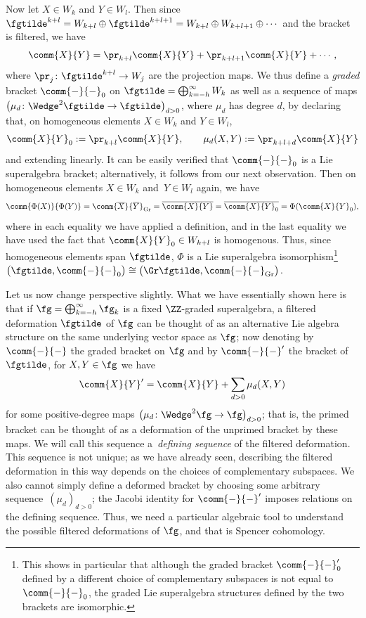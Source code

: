 Now let $X\in W_k$ and $Y\in W_l$. Then since $\fgtilde^{k+l} = W_{k+l}\oplus\fgtilde^{k+l+1} = W_{k+l}\oplus W_{k+l+1}\oplus\cdots$ and the bracket is filtered, we have
\[
	\comm{X}{Y} = \pr_{k+l}\comm{X}{Y} + \pr_{k+l+1}\comm{X}{Y} + \cdots,
\]
where $\pr_j\colon\fgtilde^{k+l}\to W_j$ are the projection maps. We thus define a \emph{graded} bracket $\comm{-}{-}_0$ on $\fgtilde=\bigoplus_{k=-h}^\infty W_k$ as well as a sequence of maps $\bigl(\mu_d\colon\Wedge^2\fgtilde\to\fgtilde\bigr)_{d> 0}$, where $\mu_d$ has degree $d$, by declaring that, on homogeneous elements $X\in W_k$ and $Y\in W_l$,
\[
	\comm{X}{Y}_0 := \pr_{k+l}\comm{X}{Y},	\qquad \mu_d(X,Y) := \pr_{k+l+d}\comm{X}{Y}
\]
and extending linearly. It can be easily verified that $\comm{-}{-}_0$ is a Lie superalgebra bracket; alternatively, it follows from our next observation. Then on homogeneous elements $X\in W_k$ and~${Y\in W_l}$ again, we have
\[
	\comm{\Phi(X)}{\Phi(Y)} = \comm{\overline{X}}{\overline{Y}}_{\mathrm{Gr}} = \overline{\comm{X}{Y}} = \overline{\comm{X}{Y}_0} = \Phi(\comm{X}{Y}_0),
\]
where in each equality we have applied a definition, and in the last equality we have used the fact that $\comm{X}{Y}_0\in W_{k+l}$ is homogenous. Thus, since homogeneous elements span $\fgtilde$, $\Phi$ is a Lie superalgebra isomorphism\footnote{This shows in particular that although the graded bracket $\comm{-}{-}'_0$ defined by a different choice of complementary subspaces is not equal to $\comm{-}{-}_0$, the graded Lie superalgebra structures defined by the two brackets are isomorphic.}
$\bigl(\fgtilde,\comm{-}{-}_0\bigr)\cong \bigl(\Gr\fgtilde,\comm{-}{-}_{\mathrm{Gr}}\bigr)$.

Let us now change perspective slightly. What we have essentially shown here is that if $\fg=\bigoplus_{k=-h}^\infty\fg_k$ is a fixed $\ZZ$-graded superalgebra, a filtered deformation $\fgtilde$ of $\fg$ can be thought of as an alternative Lie algebra structure on the same underlying vector space as $\fg$; now denoting by $\comm{-}{-}$ the graded bracket on $\fg$ and by $\comm{-}{-}'$ the bracket of $\fgtilde$, for $X,Y\in\fg$ we have
\begin{equation}\label{eq:defining-sequence}
	\comm{X}{Y}' = \comm{X}{Y} + \sum_{d>0}\mu_d(X,Y)
\end{equation}
for some positive-degree maps $\bigl(\mu_d\colon\Wedge^2\fg\to\fg\bigr)_{d> 0}$; that is, the primed bracket can be thought of as a deformation of the unprimed bracket by these maps. We will call this sequence a~\emph{defining sequence} of the filtered deformation. This sequence is not unique; as we have already seen, describing the filtered deformation in this way depends on the choices of complementary subspaces. We also cannot simply define a deformed bracket by choosing some arbitrary sequence~$(\mu_d)_{d>0}$; the Jacobi identity for $\comm{-}{-}'$ imposes relations on the defining sequence. Thus, we need a particular algebraic tool to understand the possible filtered deformations of $\fg$, and that is Spencer cohomology.

